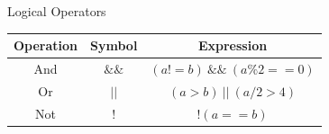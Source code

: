 \begin{frame}[fragile]{Logical Operators}{}
    \Large
    \begin{table}[]
    \centering
    \begin{tabular}{ccc}
    \hline
    \textbf{Operation} & \textbf{Symbol} & \textbf{Expression}        \\ \hline
    And                & $\&\&$          & $(a \mathrel!= b) \ \&\& \ (a \% 2 == 0)$ \\ \hline
    Or                 & $||$            & $(a > b) \ || \ (a / 2 > 4)$   \\ \hline
    Not                & $!$             & $!(a == b)$                \\ \hline
    \end{tabular}
    \end{table}
\end{frame}


